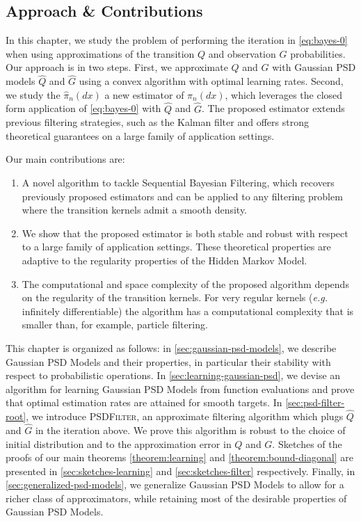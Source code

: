 \subsection*{Approach \& Contributions}
In this chapter, we study the problem of performing the iteration in \cref{eq:bayes-0} when using approximations of the transition $Q$ and observation $G$ probabilities. Our approach is in two steps. First, we approximate $Q$ and $G$ with Gaussian PSD models $\hat Q$ and $\hat G$ using a convex algorithm with optimal learning rates. Second, we study the $\hat \pi_n(dx)$ a new estimator of $\pi_n(dx)$, which leverages the closed form application of \cref{eq:bayes-0} with $\hat Q$ and $\hat G$. The proposed estimator extends previous filtering strategies, such as the Kalman filter and offers strong theoretical guarantees on a large family of application settings.

Our main contributions are:
 \begin{enumerate}
     \item A novel algorithm to tackle Sequential Bayesian Filtering, which recovers previously proposed estimators and can be applied to any filtering problem where the transition kernels admit a smooth density.
     \item We show that the proposed estimator is both stable and robust with respect to a large family of application settings. These theoretical properties are adaptive to the regularity properties of the Hidden Markov Model.
     \item The computational and space complexity of the proposed algorithm depends on the regularity of the transition kernels. For very regular kernels (\emph{e.g.\ } infinitely differentiable) the algorithm has a computational complexity that is smaller than, for example, particle filtering.
 \end{enumerate}


This chapter is organized as follows: in \cref{sec:gaussian-psd-models}, we describe Gaussian PSD Models and their properties, in particular their stability with respect to probabilistic operations. In \cref{sec:learning-gaussian-psd}, we devise an algorithm for learning Gaussian PSD Models from function evaluations and prove that optimal estimation rates are attained for smooth targets. In \cref{sec:psd-filter-root}, we introduce \textsc{PSDFilter}, an approximate filtering algorithm which plugs $\hat Q$ and $\hat G$ in the iteration above. We prove this algorithm is robust to the choice of initial distribution and to the approximation error in $Q$ and $G$. Sketches of the proofs of our main theorems \cref{theorem:learning} and \cref{theorem:bound-diagonal} are presented in \cref{sec:sketches-learning} and \cref{sec:sketches-filter} respectively. Finally, in \cref{sec:generalized-psd-models}, we generalize Gaussian PSD Models to allow for a richer class of approximators, while retaining most of the desirable properties of Gaussian PSD Models.

